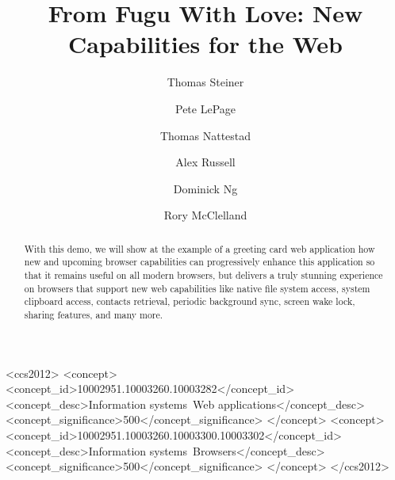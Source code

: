 \documentclass[sigconf, anonymous]{acmart}
\begin{document}
\title{From Fugu With Love: New Capabilities for the Web}

\author{Thomas Steiner}
\author{Pete LePage}
\author{Thomas Nattestad}
\author{Alex Russell}
\author{Dominick Ng}
\author{Rory McClelland}


\begin{abstract}
With this demo, we will show at the example of a greeting card web application
how new and upcoming browser capabilities can progressively enhance
this application so that it remains useful on all modern browsers,
but delivers a truly stunning experience on browsers that support new web capabilities
like native file system access, system clipboard access, contacts retrieval,
periodic background sync, screen wake lock, sharing features, and many more.
\end{abstract}

\begin{CCSXML}
<ccs2012>
<concept>
<concept_id>10002951.10003260.10003282</concept_id>
<concept_desc>Information systems~Web applications</concept_desc>
<concept_significance>500</concept_significance>
</concept>
<concept>
<concept_id>10002951.10003260.10003300.10003302</concept_id>
<concept_desc>Information systems~Browsers</concept_desc>
<concept_significance>500</concept_significance>
</concept>
</ccs2012>
\end{CCSXML}
\end{document}
